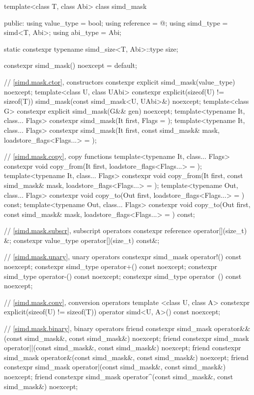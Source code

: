 \begin{codeblock}
template<class T, class Abi> class simd_mask {
public:
  using value_type = bool;
  using reference = @\seebelow@;
  using simd_type = simd<T, Abi>;
  using abi_type = Abi;

  static constexpr typename simd_size<T, Abi>::type size;

  constexpr simd_mask() noexcept = default;

  // \ref{simd.mask.ctor},  constructors
  constexpr explicit simd_mask(value_type) noexcept;
  template<class U, class UAbi>
    constexpr explicit(sizeof(U) != sizeof(T)) simd_mask(const simd_mask<U, UAbi>&) noexcept;
  template<class G> constexpr explicit simd_mask(G&& gen) noexcept;
  template<typename It, class... Flags>
    constexpr simd_mask(It first, Flags = {});
  template<typename It, class... Flags>
    constexpr simd_mask(It first, const simd_mask& mask, loadstore_flags<Flags...> = {});

  // \ref{simd.mask.copy},  copy functions
  template<typename It, class... Flags>
    constexpr void copy_from(It first, loadstore_flags<Flags...> = {});
  template<typename It, class... Flags>
    constexpr void copy_from(It first, const simd_mask& mask, loadstore_flags<Flags...> = {});
  template<typename Out, class... Flags>
    constexpr void copy_to(Out first, loadstore_flags<Flags...> = {}) const;
  template<typename Out, class... Flags>
    constexpr void copy_to(Out first, const simd_mask& mask, loadstore_flags<Flags...> = {}) const;

  // \ref{simd.mask.subscr},  subscript operators
  constexpr reference operator[](size_t) &;
  constexpr value_type operator[](size_t) const&;

  // \ref{simd.mask.unary},  unary operators
  constexpr simd_mask operator!() const noexcept;
  constexpr simd_type operator+() const noexcept;
  constexpr simd_type operator-() const noexcept;
  constexpr simd_type operator~() const noexcept;

  // \ref{simd.mask.conv},  conversion operators
  template <class U, class A>
    constexpr explicit(sizeof(U) != sizeof(T)) operator simd<U, A>() const noexcept;

  // \ref{simd.mask.binary},  binary operators
  friend constexpr simd_mask operator&&(const simd_mask&, const simd_mask&) noexcept;
  friend constexpr simd_mask operator||(const simd_mask&, const simd_mask&) noexcept;
  friend constexpr simd_mask operator&(const simd_mask&, const simd_mask&) noexcept;
  friend constexpr simd_mask operator|(const simd_mask&, const simd_mask&) noexcept;
  friend constexpr simd_mask operator^(const simd_mask&, const simd_mask&) noexcept;

}
\end{codeblock}
